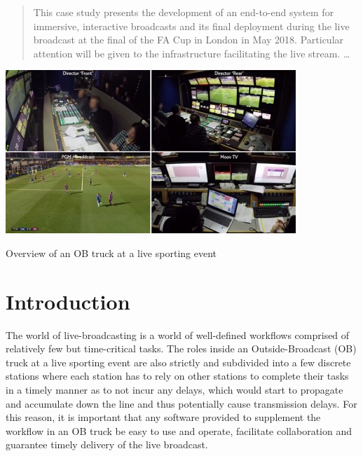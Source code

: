\documentclass[sigchi-a, authorversion]{acmart}
\begin{document}


\begin{abstract}
This case study presents the development of an end-to-end system for
immersive, interactive broadcasts and its final deployment during the live
broadcast at the final of the FA Cup in London in May 2018. Particular attention
will be given to the infrastructure facilitating the live stream.
\ldots
\end{abstract}

\begin{marginfigure}
    \vspace{15pc}
    \includegraphics[width=\marginparwidth]{Figures/overview.jpg}
    \caption{Overview of an OB truck at a live sporting event}
    \label{fig:overview}
\end{marginfigure}


\maketitle

\section{Introduction}

 The world of live-broadcasting is a world of well-defined workflows comprised of relatively few but time-critical tasks. The roles inside an Outside-Broadcast (OB) truck at a live sporting event are also strictly and subdivided into a few discrete stations where each station  has to rely on other stations to complete their tasks in a timely manner as to  not incur any delays, which would start to propagate and accumulate down the line and thus potentially cause transmission delays. For this reason, it is important that any software provided to supplement the workflow in an OB truck be easy to use and operate, facilitate collaboration and guarantee timely delivery of the live broadcast.
\end{document}
